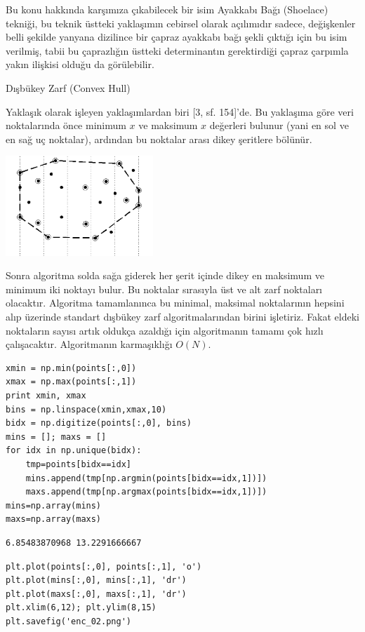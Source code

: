 \documentclass[12pt,fleqn]{article}\usepackage{../../common}
\begin{document}
Bu konu hakkında karşımıza çıkabilecek bir isim Ayakkabı Bağı (Shoelace)
tekniği, bu teknik üstteki yaklaşımın cebirsel olarak açılımıdır sadece,
değişkenler belli şekilde yanyana dizilince bir çapraz ayakkabı bağı şekli
çıktığı için bu isim verilmiş, tabii bu çaprazlığın üstteki determinantın
gerektirdiği çapraz çarpımla yakın ilişkisi olduğu da görülebilir.

Dışbükey Zarf (Convex Hull)

Yaklaşık olarak işleyen yaklaşımlardan biri [3, sf. 154]'de. Bu yaklaşıma
göre veri noktalarında önce minimum $x$ ve maksimum $x$ değerleri bulunur
(yani en sol ve en sağ uç noktalar), ardından bu noktalar arası dikey
şeritlere bölünür.

\includegraphics[width=15em]{enc_03.png}

Sonra algoritma solda sağa giderek her şerit içinde dikey en maksimum ve
minimum iki noktayı bulur. Bu noktalar sırasıyla üst ve alt zarf noktaları
olacaktır. Algoritma tamamlanınca bu minimal, maksimal noktalarının hepsini
alıp üzerinde standart dışbükey zarf algoritmalarından birini
işletiriz. Fakat eldeki noktaların sayısı artık oldukça azaldığı için
algoritmanın tamamı çok hızlı çalışacaktır. Algoritmanın karmaşıklığı
$O(N)$.

\begin{verbatim}
xmin = np.min(points[:,0])
xmax = np.max(points[:,1])
print xmin, xmax
bins = np.linspace(xmin,xmax,10)
bidx = np.digitize(points[:,0], bins)
mins = []; maxs = []
for idx in np.unique(bidx):
    tmp=points[bidx==idx]
    mins.append(tmp[np.argmin(points[bidx==idx,1])])
    maxs.append(tmp[np.argmax(points[bidx==idx,1])])
mins=np.array(mins)
maxs=np.array(maxs)
\end{verbatim}

\begin{verbatim}
6.85483870968 13.2291666667
\end{verbatim}

\begin{verbatim}
plt.plot(points[:,0], points[:,1], 'o')
plt.plot(mins[:,0], mins[:,1], 'dr')
plt.plot(maxs[:,0], maxs[:,1], 'dr')
plt.xlim(6,12); plt.ylim(8,15)
plt.savefig('enc_02.png')
\end{verbatim}
\end{document}
